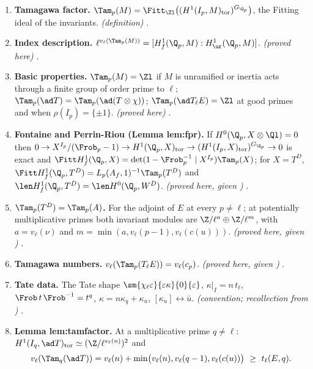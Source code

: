 \begin{enumerate}[label=\textbf{\thechapter.\arabic*}]
right side is $0$ when $\ell\nmid N$ and $\bar\rho$ is absolutely irreducible, so then $H^1_f(\Q,A_f)=0\iff H^1_f(\Q,V^D)=0$ \emph{(proved here, given the formula)}. .
\item \textbf{Tamagawa factor.} $\Tam_p(M)=\Fitt_{\Zl}\bigl((H^1(I_p,M)_{\mathrm{tor}})^{G_{\Q_p}}\bigr)$, the Fitting ideal of the invariants. \emph{(definition)} .
\item \textbf{Index description.} $\ell^{v_\ell(\Tam_p(M))}=[H^1_f(\Q_p,M):H^1_{\ur}(\Q_p,M)]$. \emph{(proved here)} .
\item \textbf{Basic properties.} $\Tam_p(M)=\Zl$ if $M$ is unramified or inertia acts through a finite group of order prime to $\ell$; $\Tam_p(\ad T)=\Tam_p(\ad(T\otimes\chi))$; $\Tam_p(\ad T_\ell E)=\Zl$ at good
primes and when $\rho(I_p)=\{\pm1\}$. \emph{(proved here)} .
\item \textbf{Fontaine and Perrin-Riou (Lemma lem:fpr).} If $H^0(\Q_p,X\otimes\Ql)=0$ then $0\to X^{I_p}/(\Frob_p-1)\to H^1(\Q_p,X)_{\mathrm{tor}}\to(H^1(I_p,X)_{\mathrm{tor}})^{G_{\Q_p}}\to0$ is exact and
$\Fitt H^1_f(\Q_p,X)=\det(1-\Frob_p^{-1}\mid X^{I_p})\Tam_p(X)$; for $X=T^D$, $\Fitt H^1_f(\Q_p,T^D)=L_p(A_f,1)^{-1}\Tam_p(T^D)$ and $\len H^1_f(\Q_p,T^D)=\len H^0(\Q_p,W^D)$. \emph{(proved here, given
)} .
\item \textbf{$\Tam_p(T^D)=\Tam_p(A)$.} For the adjoint of $E$ at every $p\ne\ell$; at potentially multiplicative primes both invariant modules are $\Z/\ell^a\oplus\Z/\ell^m$, with $a=v_\ell(\nu)$ and $m=\min(a,v_\ell(p-1),v_\ell(c(u)))$.
\emph{(proved here, given )}
.
\item \textbf{Tamagawa numbers.} $v_\ell(\Tam_p(T_\ell E))=v_\ell(c_p)$. \emph{(proved here, given )} .
\item \textbf{Tate data.} The Tate shape $\sm{\chi_\ell\varepsilon}{\varepsilon\kappa}{0}{\varepsilon}$, $\kappa|_I=n\,t_\ell$, $\Frob\,t\,\Frob^{-1}=t^q$, $\kappa=n\kappa_q+\kappa_u$, $[\kappa_u]\leftrightarrow\bar u$. \emph{(convention;
recollection from )} .
\item \textbf{Lemma lem:tamfactor.} At a multiplicative prime $q\ne\ell$: $H^1(I_q,\ad T)_{\mathrm{tor}}\simeq(\Z/\ell^{v_\ell(n)})^2$ and
\[
v_\ell(\Tam_q(\ad T))=v_\ell(n)+\min\bigl(v_\ell(n),v_\ell(q-1),v_\ell(c(u))\bigr)\ \ge\ t_\ell(E,q).
\]
\end{enumerate}
